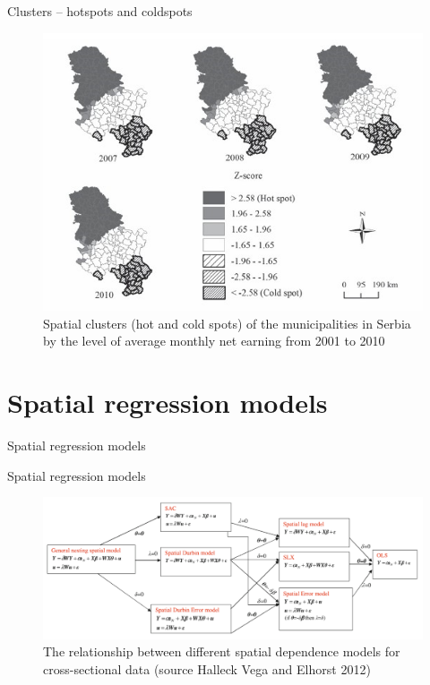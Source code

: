 \documentclass{beamer}
\begin{document}
\begin{frame}{Clusters -- hotspots and coldspots}
\begin{figure}
	\includegraphics[width=.7\textwidth]{IMG/sp_coldspot.PNG}
	\caption{Spatial clusters (hot and cold spots) of the municipalities in Serbia by the level of average monthly net earning from 2001 to 2010}
\end{figure}
\end{frame}
\section{Spatial regression models}
\begin{frame}{Spatial regression models}
\end{frame}
\begin{frame}{Spatial regression models}
\begin{figure}
	\includegraphics[width=1\textwidth]{IMG/sp_reg.PNG}
	\caption{The relationship between different spatial dependence models for cross-sectional data (source Halleck Vega and Elhorst 2012)}
\end{figure}
\end{frame}
\end{document}
